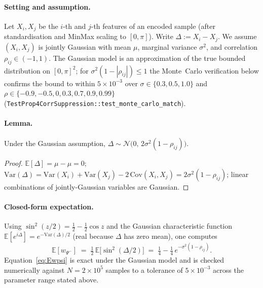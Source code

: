 \documentclass[pdflatex,sn-mathphys-num]{sn-jnl}
\theoremstyle{thmstyleone}
\theoremstyle{thmstyletwo}
\theoremstyle{thmstylethree}
\begin{document}
\paragraph{Setting and assumption.}
Let $X_i, X_j$ be the $i$-th and $j$-th features of an encoded sample
(after standardisation and MinMax scaling to $[0,\pi]$). Write
$\Delta := X_i - X_j$. We assume $(X_i, X_j)$ is jointly Gaussian
with mean $\mu$, marginal variance $\sigma^2$, and correlation
$\rho_{ij}\in(-1,1)$. The Gaussian model is an approximation of the
true bounded distribution on $[0,\pi]^2$; for $\sigma^2(1-|\rho_{ij}|)\le 1$
the Monte~Carlo verification below confirms the bound to within
$5\times 10^{-3}$ over $\sigma\in\{0.3,0.5,1.0\}$ and
$\rho\in\{-0.9,-0.5,0,0.3,0.7,0.9,0.99\}$
(\texttt{TestProp4CorrSuppression::test\_monte\_carlo\_match}).

\paragraph{Lemma.}
Under the Gaussian assumption,
$\Delta \sim \mathcal{N}\!\bigl(0,\,2\sigma^2(1-\rho_{ij})\bigr)$.
\begin{proof}
$\mathbb{E}[\Delta] = \mu - \mu = 0$;
$\mathrm{Var}(\Delta) = \mathrm{Var}(X_i) + \mathrm{Var}(X_j) - 2\,\mathrm{Cov}(X_i, X_j)
= 2\sigma^2(1-\rho_{ij})$;
linear combinations of jointly-Gaussian variables are Gaussian.
\end{proof}

\paragraph{Closed-form expectation.}
Using $\sin^2(z/2) = \tfrac12 - \tfrac12 \cos z$ and the Gaussian
characteristic function
$\mathbb{E}[e^{i\Delta}] = e^{-\mathrm{Var}(\Delta)/2}$
(real because $\Delta$ has zero mean), one computes
\begin{equation}\label{eq:Ewpsi}
\mathbb{E}[w_{\Psi^-}]
\;=\; \tfrac12\,\mathbb{E}\!\bigl[\sin^2(\Delta/2)\bigr]
\;=\; \tfrac14 - \tfrac14\, e^{-\sigma^2(1-\rho_{ij})}.
\end{equation}
Equation~\eqref{eq:Ewpsi} is exact under the Gaussian model and is
checked numerically against $N=2\times 10^{5}$ samples to a tolerance
of $5\times 10^{-3}$ across the parameter range stated above.
\end{document}
